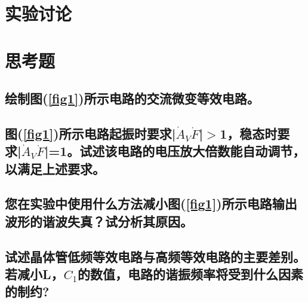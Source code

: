 \documentclass[a4paper]{article}
\begin{document}
\section{实验讨论}

\section{思考题}
\subsection{绘制图(\ref{fig1})所示电路的交流微变等效电路。}
\subsection{图(\ref{fig1})所示电路起振时要求|$\dot{A}_V\dot{F}$|$>$1，稳态时要求|$\dot{A}_V\dot{F}$|=1。试述该电路的电压放大倍数能自动调节，以满足上述要求。}
\subsection{您在实验中使用什么方法减小图(\ref{fig1})所示电路输出波形的谐波失真？试分析其原因。}
\subsection{试述晶体管低频等效电路与高频等效电路的主要差别。若减小L，$C_1$的数值，电路的谐振频率将受到什么因素的制约?}

\nocite{jiaocai}

\end{document}
